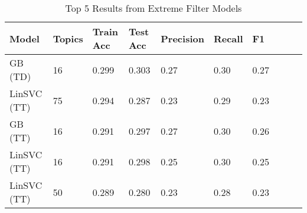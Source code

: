 \begin{table}[!t]
    \centering
    \caption{Top 5 Results from Extreme Filter Models}
    \label{tab:extreme-results}
    \begin{tabular}{@{}llllllllll@{}}
    \toprule
    \rowcolor[HTML]{FFFFFF} 
    \textbf{Model} & \textbf{Topics} & \textbf{Train Acc} & \textbf{Test Acc} & \textbf{Precision} & \textbf{Recall} & \textbf{F1} \\ \midrule
    GB (TD)     & 16 & 0.299 & 0.303 & 0.27 & 0.30 & 0.27 \\
    LinSVC (TT) & 75 & 0.294 & 0.287 & 0.23 & 0.29 & 0.23 \\
    GB (TT)     & 16 & 0.291 & 0.297 & 0.27	& 0.30 & 0.26 \\
    LinSVC (TT) & 16 & 0.291 & 0.298 & 0.25	& 0.30 & 0.25 \\
    LinSVC (TT) & 50 & 0.289 & 0.280 & 0.23	& 0.28 & 0.23
\end{tabular}
\end{table}